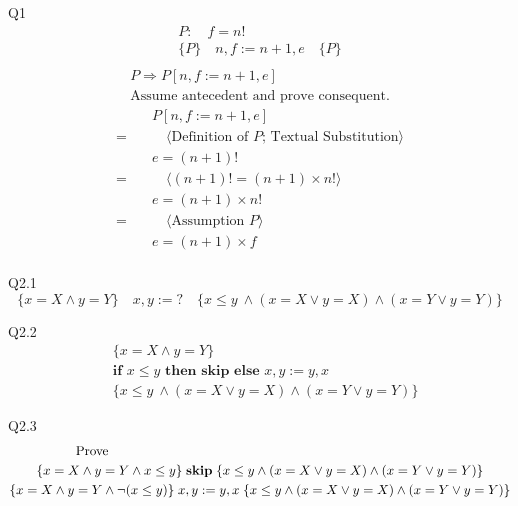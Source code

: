 \documentclass{article}
\begin{document}
    Q1
    \begin{gather*}
        P:\quad f = n! \\
        \{P\}\quad n, f := n+1, e\quad \{P\} \\
    \end{gather*}
    \begin{gather*}
        P \Longrightarrow P[n, f := n+1, e] \\
        \text{Assume antecedent and prove consequent.}
    \end{gather*}
    \begin{align*}
        & \quad P[n, f := n+1, e] \\ 
        = & \quad\quad \langle \text{Definition of } P \text{; Textual Substitution} \rangle \\
        & \quad e = (n+1)! \\ 
        = & \quad\quad \langle (n+1)! = (n+1) \times n! \rangle \\
        & \quad e = (n+1) \times n! \\ 
        = & \quad\quad \langle \text{Assumption } P \rangle \\
        & \quad e = (n+1) \times f \\ 
    \end{align*}

    \vspace{10mm}
    Q2.1
    \begin{equation*}
        \{x = X \land y = Y\} \quad x, y := ? \quad \{x \leq y\ \land (x = X \vee y = X) \land (x = Y \vee y = Y) \}
    \end{equation*}
    
    Q2.2
    \begin{align*}
        & \{x = X \land y = Y\} \\
        & \textbf{if } x \leq y \textbf{ then skip else } x, y := y, x \\
        & \{x \leq y\ \land (x = X \vee y = X) \land (x = Y \vee y = Y) \}
    \end{align*}
    
    Q2.3
    \begin{gather*}
        \text{Prove} \hspace{90mm} \\
        \{x = X \land y = Y \land x \leq y\} \;\textbf{skip}\; \{x \leq y \land (x = X \vee y = X) \land (x = Y \vee y = Y) \} \\
        \{x = X \land y = Y \land \neg(x \leq y)\} \;x, y := y, x\; \{x \leq y \land (x = X \vee y = X) \land (x = Y \vee y = Y) \} \\
    \end{gather*}
\end{document}
